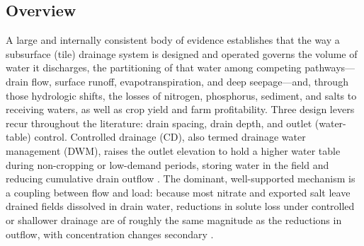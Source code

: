 \subsection{Overview}

A large and internally consistent body of evidence establishes that the way a
subsurface (tile) drainage system is designed and operated governs the volume of
water it discharges, the partitioning of that water among competing
pathways---drain flow, surface runoff, evapotranspiration, and deep
seepage---and, through those hydrologic shifts, the losses of nitrogen,
phosphorus, sediment, and salts to receiving waters, as well as crop yield and
farm profitability. Three design levers recur throughout the literature: drain
spacing, drain depth, and outlet (water-table) control. Controlled drainage
(CD), also termed drainage water management (DWM), raises the outlet elevation
to hold a higher water table during non-cropping or low-demand periods, storing
water in the field and reducing cumulative drain outflow
\parencite{Singh2020,Strock2011,Blann2009}. The dominant, well-supported
mechanism is a coupling between flow and load: because most nitrate and exported
salt leave drained fields dissolved in drain water, reductions in solute loss
under controlled or shallower drainage are of roughly the same magnitude as the
reductions in outflow, with concentration changes secondary
\parencite{Wesström2007,Frankenberger2024,Lalonde1996,Tolomio2018}.

